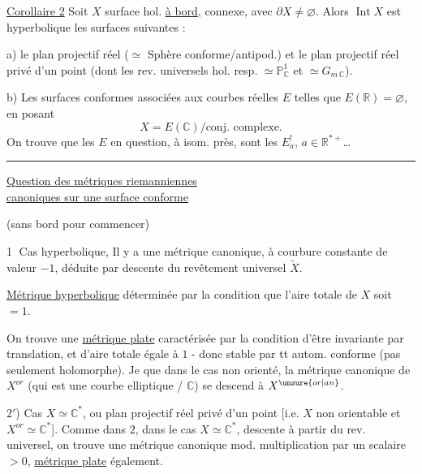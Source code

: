 \uline{Corollaire 2} Soit $X$ surface hol. \uline{à bord},  connexe, avec $\partial X\ne\varnothing$. Alors $\operatorname{Int}X$ est hyperbolique
les surfaces suivantes :

a) le plan projectif réel ($\simeq$ Sphère conforme/antipod.) et le plan projectif réel privé d'un point (dont les rev. universels hol. resp. $\simeq\mathbb P^1_{\mathbb C}$ et $\simeq G_{m\,\mathbb C}$).

b) Les surfaces conformes associées aux courbes  réelles $E$ telles que $E(\mathbb R)=\varnothing$, en posant 
\[
X=E(\mathbb C)/\text{conj. complexe}.
\]
On trouve que les $E$ en question, à isom. près, sont les $E_a^!$, $a\in\mathbb R^{*+}$\ldots

\rule{\linewidth}{0.3pt}

\uline{Question des  métriques riemanniennes}\\
\uline{canoniques sur une surface conforme}

(sans bord pour commencer)

\textcircled{1} Cas hyperbolique, Il y a une métrique canonique, à courbure constante de valeur $-1$, déduite par descente du revêtement universel $\widetilde X$.

\uline{Métrique hyperbolique}
déterminée par la condition que l'aire totale de $X$ soit $=1$.

On trouve une \uline{métrique plate} caractérisée par la condition d'être invariante par translation, et d'aire  totale égale à $1$ - donc stable par tt autom. conforme (pas seulement holomorphe). Je  que dans le cas non orienté, la métrique canonique de $X^{or}$ (qui est une courbe elliptique / $\mathbb C$) se descend à $X^{\unsure{or|an}}$.

$2'$) Cas $X\simeq\mathbb C^*$, ou plan projectif réel privé d'un point [i.e. $X$ non orientable et $X^{or}\simeq\mathbb C^*$]. Comme dans $2$, dans le cas $X\simeq\mathbb C^*$,   descente à partir du rev. universel, on trouve une métrique canonique mod. multiplication par un scalaire $>0$, \uline{métrique plate} également.

